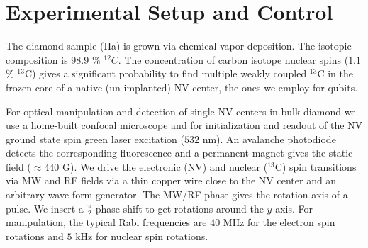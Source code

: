\documentclass[aps,floatfix,footinbib,superscriptaddress]{revtex4-1}
\begin{document}
\author{T. Unden}

\author{D. Louzon}

\author{M. Zwolak}

\author{W. H. Zurek}

\author{F. Jelezko}

\maketitle

\renewcommand\thefigure{S\arabic{figure}}

\section{Experimental Setup and Control}

The diamond sample (IIa) is grown via chemical vapor deposition. The isotopic composition is $98.9$ \% $^{12}C$. The concentration of carbon isotope nuclear spins ($1.1$ \% $^{13}$C) gives a significant probability to find multiple weakly coupled $^{13}$C in the frozen core of a native (un-implanted) NV center, the ones we employ for qubits.

For optical manipulation and detection of single NV centers in bulk diamond we use a home-built confocal microscope and for initialization and readout of the NV ground state spin green laser excitation ($532$ nm). An avalanche photodiode detects the corresponding fluorescence and a permanent magnet gives the static field ($\approx440$ G). We drive the electronic (NV) and nuclear ($^{13}$C) spin transitions via MW and RF fields via a thin copper wire close to the NV center and an arbitrary-wave form generator. The MW/RF phase gives the rotation axis of a pulse. We insert a $\frac{\pi}{2}$ phase-shift to get rotations around the $y$-axis. For manipulation, the typical Rabi frequencies are $40$ MHz for the electron spin rotations and $5$ kHz for nuclear spin rotations.
\end{document}
